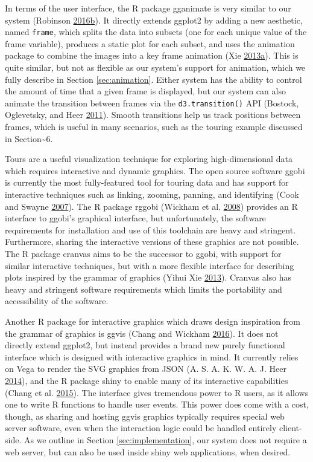 \documentclass[12pt,]{isuthesis}
\begin{document}
In terms of the user interface, the R package gganimate is very similar
to our system (Robinson
\protect\hyperlink{ref-gganimate}{2016}\protect\hyperlink{ref-gganimate}{b}).
It directly extends ggplot2 by adding a new aesthetic, named
\texttt{frame}, which splits the data into subsets (one for each unique
value of the frame variable), produces a static plot for each subset,
and uses the animation package to combine the images into a key frame
animation (Xie
\protect\hyperlink{ref-animation}{2013}\protect\hyperlink{ref-animation}{a}).
This is quite similar, but not as flexible as our system's support for
animation, which we fully describe in Section \ref{sec:animation}.
Either system has the ability to control the amount of time that a given
frame is displayed, but our system can also animate the transition
between frames via the \texttt{d3.transition()} API (Bostock,
Oglevetsky, and Heer \protect\hyperlink{ref-d3}{2011}). Smooth
transitions help us track positions between frames, which is useful in
many scenarios, such as the touring example discussed in
Section\textasciitilde{}6.

Tours are a useful visualization technique for exploring
high-dimensional data which requires interactive and dynamic graphics.
The open source software ggobi is currently the most fully-featured tool
for touring data and has support for interactive techniques such as
linking, zooming, panning, and identifying (Cook and Swayne
\protect\hyperlink{ref-ggobi:2007}{2007}). The R package rggobi (Wickham
et al. \protect\hyperlink{ref-rggobi}{2008}) provides an R interface to
ggobi's graphical interface, but unfortunately, the software
requirements for installation and use of this toolchain are heavy and
stringent. Furthermore, sharing the interactive versions of these
graphics are not possible. The R package cranvas aims to be the
successor to ggobi, with support for similar interactive techniques, but
with a more flexible interface for describing plots inspired by the
grammar of graphics (Yihui Xie \protect\hyperlink{ref-cranvas}{2013}).
Cranvas also has heavy and stringent software requirements which limits
the portability and accessibility of the software.

Another R package for interactive graphics which draws design
inspiration from the grammar of graphics is ggvis (Chang and Wickham
\protect\hyperlink{ref-ggvis}{2016}). It does not directly extend
ggplot2, but instead provides a brand new purely functional interface
which is designed with interactive graphics in mind. It currently relies
on Vega to render the SVG graphics from JSON (A. S. A. K. W. A. J. Heer
\protect\hyperlink{ref-vega}{2014}), and the R package shiny to enable
many of its interactive capabilities (Chang et al.
\protect\hyperlink{ref-shiny}{2015}). The interface gives tremendous
power to R users, as it allows one to write R functions to handle user
events. This power does come with a cost, though, as sharing and hosting
ggvis graphics typically requires special web server software, even when
the interaction logic could be handled entirely client-side. As we
outline in Section \ref{sec:implementation}, our system does not require
a web server, but can also be used inside shiny web applications, when
desired.
\end{document}
